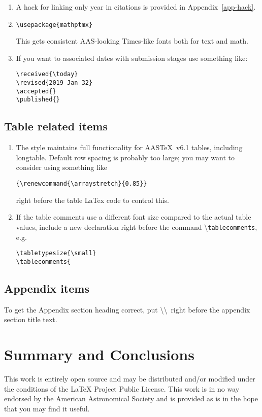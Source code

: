\documentclass[tighten,twocolumn,useAMS,appendixfloats,apj]{likeapj}
\newcommand\aastex{AAS\TeX}
\begin{document}
{{\begin{enumerate}
  Replace {\tt apj} with one of {\tt apjs}, {\tt aj}, {\tt pasp}, {\tt apjl} or {\tt noj} for no journal in running head.

\item A hack for linking only year in citations is provided in Appendix~\ref{app-hack}.

\item {\tt {\textbackslash}usepackage\{mathptmx\}}
  
  This gets consistent AAS-looking Times-like fonts both for text and math.

\item If you want to associated dates with submission stages use something like:
\begin{verbatim}
\received{\today}
\revised{2019 Jan 32}
\accepted{}
\published{}
\end{verbatim}
 
\end{enumerate}

\subsection{Table related items}
\begin{enumerate}
\item The style maintains full functionality for \aastex\ v6.1 tables, including longtable. Default row spacing is probably too large; you may want to consider using something like
\begin{verbatim}
{\renewcommand{\arraystretch}{0.85}}
\end{verbatim}
right before the table LaTex code to control this.
\item If the table comments use a different font size compared to the actual table values, include a new declaration right before the command {\textbackslash}{\tt tablecomments}, e.g.
  \begin{verbatim}
\tabletypesize{\small}
\tablecomments{
\end{verbatim}

\end{enumerate}

\subsection{Appendix items}
To get the Appendix section heading correct, put \textbackslash\textbackslash\ right before the appendix section title text.

\section{Summary and Conclusions}
This work is entirely open source and may be distributed and/or modified under the conditions of the LaTeX Project Public License. This work is in no way endorsed by the American Astronomical Society and is provided as is in the hope that you may find it useful.

}}
\end{document}
